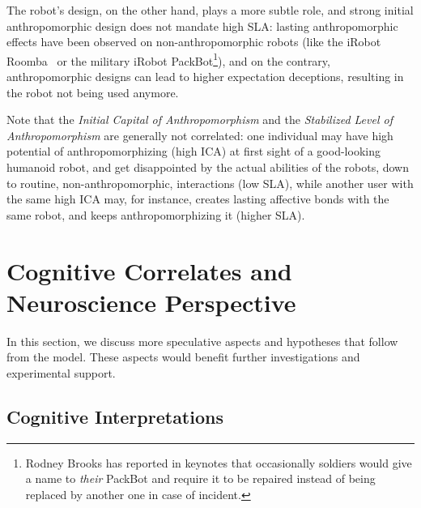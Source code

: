 \documentclass{frontiersSCNS} %
\begin{document}
The robot's design, on the other hand, plays a more subtle role, and strong
initial anthropomorphic design does not mandate high SLA: lasting
anthropomorphic effects have been observed on non-anthropomorphic robots (like
the iRobot Roomba~\cite{fink_living_2013} or the military iRobot
PackBot\footnote{Rodney Brooks has reported in keynotes that occasionally
soldiers would give a name to \emph{their} PackBot and require it to be repaired
instead of being replaced by another one in case of incident.}), and on the
contrary, anthropomorphic designs can lead to higher expectation deceptions,
resulting in the robot not being used anymore.

Note that the \emph{Initial Capital of Anthropomorphism} and the
\emph{Stabilized Level of Anthropomorphism} are generally not correlated: one
individual may have high potential of anthropomorphizing (high ICA) at first
sight of a good-looking humanoid robot, and get disappointed by the actual
abilities of the robots, down to routine, non-anthropomorphic, interactions (low
SLA), while another user with the same high ICA may, for instance, creates
lasting affective bonds with the same robot, and keeps anthropomorphizing it
(higher SLA).



%
%
%
%
%
%
%
%
%

\vspace{2cm}
\section{Cognitive Correlates and Neuroscience Perspective}
\label{sec:cognition-neuroscience}

In this section, we discuss more speculative aspects and hypotheses that follow
from the model. These aspects would benefit further investigations and
experimental support.

\subsection*{Cognitive Interpretations}
\label{sec:cognitive-model}
\end{document}
